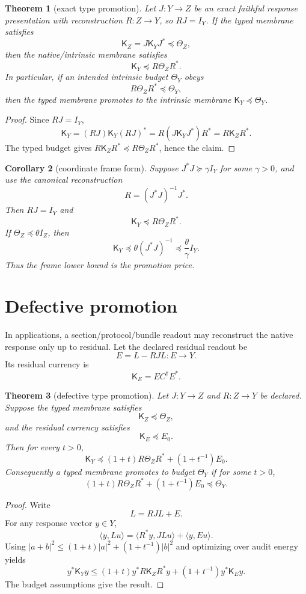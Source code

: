 \documentclass[11pt]{article}
\newtheorem{theorem}{Theorem}[section]
\newtheorem{corollary}[theorem]{Corollary}
\newcommand{\K}{\mathsf K}
\newcommand{\Th}{\Theta}
\newcommand{\Loewner}{\preceq}
\begin{document}
\begin{theorem}[exact type promotion]
Let \(J:Y\to Z\) be an exact faithful response presentation with reconstruction \(R:Z\to Y\), so \(RJ=I_Y\).  If the typed membrane satisfies
\[
\K_Z=J\K_YJ^*\Loewner \Th_Z,
\]
then the native/intrinsic membrane satisfies
\[
\boxed{\K_Y\Loewner R\Th_ZR^*.}
\]
In particular, if an intended intrinsic budget \(\Th_Y\) obeys
\[
R\Th_ZR^*\Loewner\Th_Y,
\]
then the typed membrane promotes to the intrinsic membrane \(\K_Y\Loewner\Th_Y\).
\end{theorem}

\begin{proof}
Since \(RJ=I_Y\),
\[
\K_Y=(RJ)\K_Y(RJ)^*=R(J\K_YJ^*)R^*=R\K_ZR^*.
\]
The typed budget gives \(R\K_ZR^*\Loewner R\Th_ZR^*\), hence the claim.
\end{proof}

\begin{corollary}[coordinate frame form]
Suppose \(J^*J\succeq \gamma I_Y\) for some \(\gamma>0\), and use the canonical reconstruction
\[
R=(J^*J)^{-1}J^*.
\]
Then \(RJ=I_Y\) and
\[
\K_Y\Loewner R\Th_ZR^*.
\]
If \(\Th_Z\Loewner \theta I_Z\), then
\[
\K_Y\Loewner \theta (J^*J)^{-1}\Loewner \frac{\theta}{\gamma}I_Y.
\]
Thus the frame lower bound is the promotion price.
\end{corollary}

\section{Defective promotion}

In applications, a section/protocol/bundle readout may reconstruct the native response only up to residual.  Let the declared residual readout be
\[
E = L - R J L:E\to Y.
\]
Its residual currency is
\[
\K_E=E C^\dagger E^*.
\]

\begin{theorem}[defective type promotion]
Let \(J:Y\to Z\) and \(R:Z\to Y\) be declared.  Suppose the typed membrane satisfies
\[
\K_Z\Loewner\Th_Z,
\]
and the residual currency satisfies
\[
\K_E\Loewner E_0.
\]
Then for every \(t>0\),
\[
\boxed{\K_Y\Loewner (1+t)R\Th_ZR^*+(1+t^{-1})E_0.}
\]
Consequently a typed membrane promotes to budget \(\Th_Y\) if for some \(t>0\),
\[
(1+t)R\Th_ZR^*+(1+t^{-1})E_0\Loewner\Th_Y.
\]
\end{theorem}

\begin{proof}
Write
\[
L=RJL+E.
\]
For any response vector \(y\in Y\),
\[
\langle y,Lu\rangle
=\langle R^*y,JLu\rangle+\langle y,Eu\rangle.
\]
Using \(|a+b|^2\le(1+t)|a|^2+(1+t^{-1})|b|^2\) and optimizing over audit energy yields
\[
y^*\K_Yy\le (1+t)y^*R\K_ZR^*y+(1+t^{-1})y^*\K_Ey.
\]
The budget assumptions give the result.
\end{proof}
\end{document}
